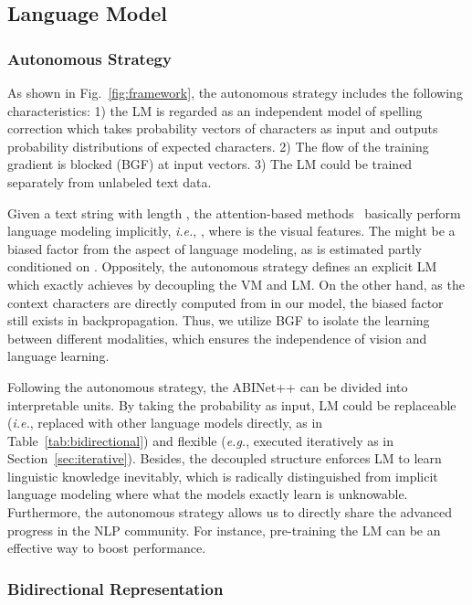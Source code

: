 \documentclass[10pt,journal,compsoc]{IEEEtran}
\def\ie{{\it i.e.}\xspace}
\def\eg{{\it e.g.}\xspace}
\begin{document}
\subsection{Language Model}
\subsubsection{Autonomous Strategy}
\label{sec:autonomous}

As shown in Fig.~\ref{fig:framework}, the autonomous strategy includes the following characteristics: 1) the LM is regarded as an independent model of spelling correction which takes probability vectors of characters as input and outputs probability distributions of expected characters. 2) The flow of the training gradient is blocked (BGF) at input vectors. 3) The LM could be trained separately from unlabeled text data.


Given a text string  with length , the attention-based methods~\cite{lee2016recursive,shi2018aster,cheng2017focusing,li2019show,sheng2019nrtr} basically perform language modeling implicitly, \ie, , where  is the visual features. The  might be a biased factor from the aspect of language modeling, as  is estimated partly conditioned on . Oppositely, the autonomous strategy defines an explicit LM which exactly achieves  by decoupling the VM and LM. On the other hand, as the context characters  are directly computed from  in our model, the biased factor still exists in backpropagation. Thus, we utilize BGF to isolate the learning between different modalities, which ensures the independence of vision and language learning.


Following the autonomous strategy, the ABINet++ can be divided into interpretable units. By taking the probability as input, LM could be replaceable (\ie, replaced with other language models directly, as in Table~\ref{tab:bidirectional}) and flexible (\eg, executed iteratively as in Section~\ref{sec:iterative}). Besides, the decoupled structure enforces LM to learn linguistic knowledge inevitably, which is radically distinguished from implicit language modeling where what the models exactly learn is unknowable. Furthermore, the autonomous strategy allows us to directly share the advanced progress in the NLP community. For instance, pre-training the LM can be an effective way to boost performance.



\subsubsection{Bidirectional Representation}
\end{document}
